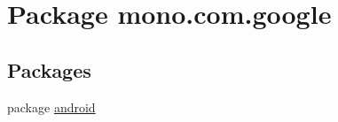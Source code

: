 \hypertarget{namespacemono_1_1com_1_1google}{\section{Package mono.\+com.\+google}
\label{namespacemono_1_1com_1_1google}
}
\subsection*{Packages}
\begin{DoxyCompactItemize}
\item 
package \hyperlink{namespacemono_1_1com_1_1google_1_1android}{android}
\end{DoxyCompactItemize}
